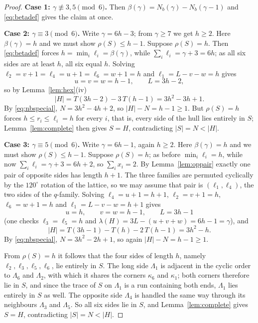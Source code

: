 \documentclass[11pt]{article}
\theoremstyle{plain}
\theoremstyle{definition}
\theoremstyle{remark}
\begin{document}
\begin{proof}
\medskip\noindent\textbf{Case 1: \(\gamma\not\equiv3,5\pmod6\).} Then
\(\beta(\gamma)=N_{b}(\gamma)-N_{b}(\gamma-1)\) and \eqref{eq:betadef} gives the claim at
once.

\medskip\noindent\textbf{Case 2: \(\gamma\equiv3\pmod6\).} Write \(\gamma=6h-3\); from
\(\gamma\ge7\) we get \(h\ge2\). Here \(\beta(\gamma)=h\) and we must show
\(\rho(S)\le h-1\). Suppose \(\rho(S)=h\). Then \eqref{eq:betadef} forces
\(h=\min_{i}\ell_{i}=\beta(\gamma)\), while \(\sum_{i}\ell_{i}=\gamma+3=6h\); as all six
sides are at least \(h\), all six equal \(h\). Solving
\(\ell_{2}=v+1=\ell_{4}=u+1=\ell_{6}=w+1=h\) and \(\ell_{1}=L-v-w=h\) gives
\[
   u=v=w=h-1,\qquad L=3h-2,
\]
so by Lemma~\ref{lem:hex}(iv)
\[
   |H|=T(3h-2)-3\,T(h-1)=3h^{2}-3h+1 .
\]
By \eqref{eq:nbspecial}, \(N=3h^{2}-4h+2\), so \(|H|-N=h-1\ge1\). But \(\rho(S)=h\) forces
\(h\le r_{i}\le\ell_{i}=h\) for every \(i\), that is, every side of the hull lies entirely
in \(S\); Lemma~\ref{lem:complete} then gives \(S=H\), contradicting \(|S|=N<|H|\).

\medskip\noindent\textbf{Case 3: \(\gamma\equiv5\pmod6\).} Write \(\gamma=6h-1\), again
\(h\ge2\). Here \(\beta(\gamma)=h\) and we must show \(\rho(S)\le h-1\). Suppose
\(\rho(S)=h\); as before \(\min_{i}\ell_{i}=h\), while now
\(\sum_{i}\ell_{i}=\gamma+3=6h+2\), so \(\sum_{i}x_{i}=2\). By Lemma~\ref{lem:oppair}
exactly one pair of opposite sides has length \(h+1\). The three families are permuted
cyclically by the \(120^{\circ}\) rotation of the lattice, so we may assume that pair is
\((\ell_{1},\ell_{4})\), the two sides of the \(q\)-family. Solving
\(\ell_{4}=u+1=h+1\), \(\ell_{2}=v+1=h\), \(\ell_{6}=w+1=h\) and \(\ell_{1}=L-v-w=h+1\)
gives
\[
   u=h,\qquad v=w=h-1,\qquad L=3h-1
\]
(one checks \(\ell_{3}=\ell_{5}=h\) and \(\lambda(H)=3L-(u+v+w)=6h-1=\gamma\)), and
\[
   |H|=T(3h-1)-T(h)-2\,T(h-1)=3h^{2}-h .
\]
By \eqref{eq:nbspecial}, \(N=3h^{2}-2h+1\), so again \(|H|-N=h-1\ge1\).

From \(\rho(S)=h\) it follows that the four sides of length \(h\), namely
\(\ell_{2},\ell_{3},\ell_{5},\ell_{6}\), lie entirely in \(S\). The long side
\(\Lambda_{1}\) is adjacent in the cyclic order to \(\Lambda_{6}\) and \(\Lambda_{2}\),
with which it shares the corners \(\kappa_{6}\) and \(\kappa_{1}\); both corners therefore
lie in \(S\), and since the trace of \(S\) on \(\Lambda_{1}\) is a run containing both ends,
\(\Lambda_{1}\) lies entirely in \(S\) as well. The opposite side \(\Lambda_{4}\) is handled
the same way through its neighbours \(\Lambda_{3}\) and \(\Lambda_{5}\). So all six sides
lie in \(S\), and Lemma~\ref{lem:complete} gives \(S=H\), contradicting \(|S|=N<|H|\).
\end{proof}
\end{document}

